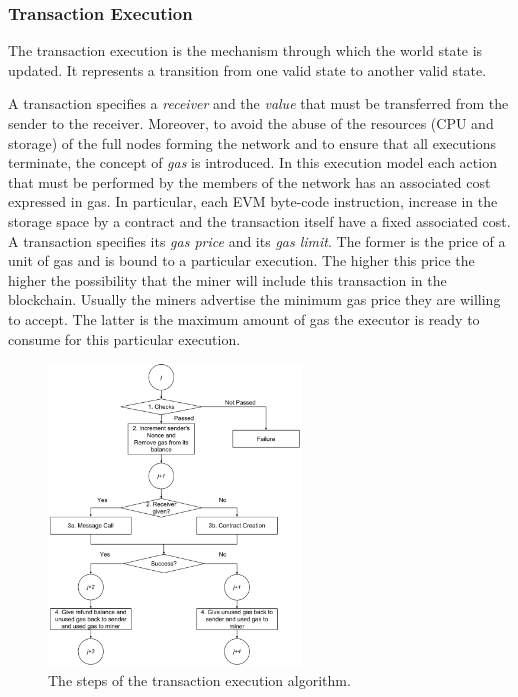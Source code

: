 \subsubsection{Transaction Execution}
\label{sec:tx-execution}

The transaction execution is the mechanism through which the world state is
updated. It represents a transition from one valid state to another valid state.

A transaction specifies a \emph{receiver} and the \emph{value} that must be
transferred from the sender to the receiver. Moreover, to avoid the abuse of the
resources (CPU and storage) of the full nodes forming the network and to ensure
that all executions terminate, the concept of \emph{gas} is introduced. In this
execution model each action that must be performed by the members of the network
has an associated cost expressed in gas. In particular, each EVM byte-code
instruction, increase in the storage space by a contract and the transaction
itself have a fixed associated cost. A transaction specifies its \emph{gas
price} and its \emph{gas limit}. The former is the price of a unit of gas and is
bound to a particular execution. The higher this price the higher the
possibility that the miner will include this transaction in the blockchain.
Usually the miners advertise the minimum gas price they are willing to accept.
The latter is the maximum amount of gas the executor is ready to consume for
this particular execution.

\begin{figure}[h!]
	\begin{center}
		\includegraphics[width=0.60\textwidth]{./res/img/transaction-execution.pdf}
	\end{center}
	\caption{The steps of the transaction execution algorithm.}
	\label{fig:tx:execution}
\end{figure}

